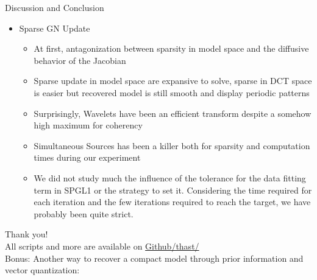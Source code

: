 \documentclass[12pt]{beamer}
\begin{document}
\begin{frame}{Discussion and Conclusion}
\begin{itemize}
  \item Sparse GN Update
  \begin{itemize}
    \item At first, antagonization between sparsity in model space and the diffusive behavior of the Jacobian
    \vspace{3pt}
    \item Sparse update in model space are expansive to solve, sparse in DCT space is easier but recovered model is still smooth and display periodic patterns
    \vspace{3pt}
    \item Surprisingly, Wavelets have been an efficient transform despite a somehow high maximum for coherency
    \vspace{3pt}
    \item Simultaneous Sources has been a killer both for sparsity and computation times during our experiment
    \vspace{3pt}
    \item We did not study much the influence of the tolerance for the data fitting term in SPGL1 or the strategy to set it. Considering the time required for each iteration and the few iterations required to reach the target, we have probably been quite strict.
  \end{itemize}
\end{itemize}
\end{frame}


\begin{frame}

\begin{center}
{\Huge Thank you! \\}
\vspace{10pt}
All scripts and more are available on \href{https://github.com/thast/EOSC513}{\color{blue} Github/thast/} \\
\vspace{20pt}
Bonus: Another way to recover a compact model through prior information and vector quantization:
\end{center}

\begin{figure}
\end{figure}

\end{frame}
\end{document}
